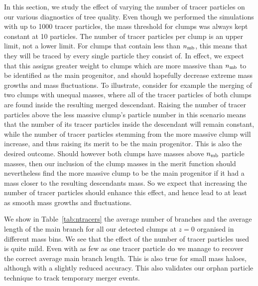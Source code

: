 In this section, we study the effect of varying the number of tracer
particles on our various diagnostics of tree quality. 
Even though we performed the simulations with
up to 1000 tracer particles, the mass threshold for clumps was always
kept constant at 10 particles. The number of tracer particles per clump 
is an upper limit, not a lower limit. For clumps that contain less than 
$n_{\rm mb}$, this means that they will be traced by every single 
particle they consist of. In effect, we expect that this assigns greater
weight to clumps which are more massive than $n_{\rm mb}$ to be identified 
as the main progenitor, and should hopefully decrease extreme 
mass growths and mass fluctuations. To illustrate, consider for example the 
merging of two clumps with unequal masses, where
all of the tracer particles of both clumps are found inside the resulting
merged descendant. Raising the number of tracer particles above the less
massive clump's particle number in this scenario means that the number of
its tracer particles inside the descendant will remain constant, while
the number of tracer particles stemming from the more massive clump will
increase, and thus raising its merit to be the main progenitor. This is 
also the desired outcome. 
Should however both clumps have masses above $n_{\rm mb}$ particle masses,
then our inclusion of the clump masses in the merit function should 
nevertheless find the more massive clump to be the main progenitor if it
had a mass closer to the resulting descendants mass. So we expect that 
increasing the number of tracer particles should enhance this effect,
and hence lead to at least as smooth mass growths and fluctuations.



We show in
Table~\ref{tab:ntracers} the average number of branches and the
average length of the main branch for all our detected clumps at $z=0$
organised in different mass bins. We see that the effect of the number
of tracer particles used is quite mild. Even with as few as one tracer
particle do we manage to recover the correct average main branch
length. This is also true for small mass haloes, although with a
slightly reduced accuracy. This also validates our orphan particle
technique to track temporary merger events.

